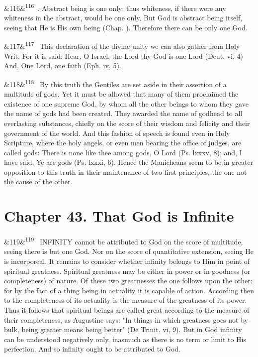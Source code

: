 \documentclass[12pt]{article}
\newcommand{\para}[1][]{\par\noindent\ifx&#1&\else\textsuperscript{\footnotesize #1}~\fi}
\begin{document}
\para[116] 13. Abstract being is one only: thus whiteness, if there were any whiteness in the abstract, would be one only. But God is abstract being itself, seeing that He is His own being (Chap. ). Therefore there can be only one God.

\para[117] This declaration of the divine unity we can also gather from Holy Writ. For it is said: Hear, O Israel, the Lord thy God is one Lord (Deut. vi, 4) And, One Lord, one faith (Eph. iv, 5).

\para[118] By this truth the Gentiles are set aside in their assertion of a multitude of gods. Yet it must be allowed that many of them proclaimed the existence of one supreme God, by whom all the other beings to whom they gave the name of gods had been created. They awarded the name of godhead to all everlasting substances, chiefly on the score of their wisdom and felicity and their government of the world. And this fashion of speech is found even in Holy Scripture, where the holy angels, or even men bearing the office of judges, are called gods: There is none like thee among gods, O Lord (Ps. lxxxv, 8); and, I have said, Ye are gods (Ps. lxxxi, 6). Hence the Manicheans seem to be in greater opposition to this truth in their maintenance of two first principles, the one not the cause of the other.

\section*{Chapter 43. That God is Infinite}

\para[119] INFINITY cannot be attributed to God on the score of multitude, seeing there is but one God. Nor on the score of quantitative extension, seeing He is incorporeal. It remains to consider whether infinity belongs to Him in point of spiritual greatness. Spiritual greatness may be either in power or in goodness (or completeness) of nature. Of these two greatnesses the one follows upon the other: for by the fact of a thing being in actuality it is capable of action. According then to the completeness of its actuality is the measure of the greatness of its power. Thus it follows that spiritual beings are called great according to the measure of their completeness, as Augustine says: "In things in which greatness goes not by bulk, being greater means being better" (De Trinit. vi, 9). But in God infinity can be understood negatively only, inasmuch as there is no term or limit to His perfection. And so infinity ought to be attributed to God.
\end{document}
